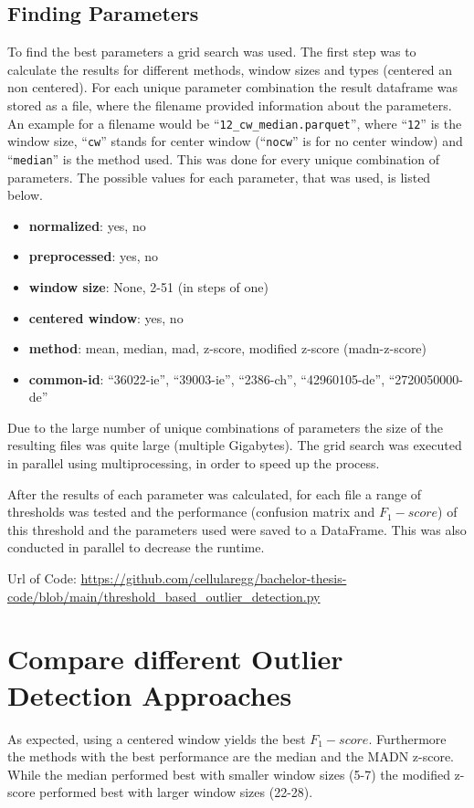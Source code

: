 \subsection{Finding Parameters}
To find the best parameters a grid search was used. The first step was to calculate the results for different methods, window sizes and types (centered an non centered). For each unique parameter combination the result dataframe was stored as a file, where the filename provided information about the parameters. An example for a filename would be ``\verb|12_cw_median.parquet|'', where ``\verb|12|'' is the window size, ``\verb|cw|'' stands for center window (``\verb|nocw|'' is for no center window) and ``\verb|median|'' is the method used. This was done for every unique combination of parameters. The possible values for each parameter, that was used, is listed below.
\begin{itemize}
    \item \textbf{normalized}: yes, no
    \item \textbf{preprocessed}: yes, no 
    \item \textbf{window size}: None, 2-51 (in steps of one)
    \item \textbf{centered window}: yes, no
    \item \textbf{method}: mean, median, mad, z-score, modified z-score (madn-z-score)
    \item \textbf{common-id}: ``36022-ie'', ``39003-ie'', ``2386-ch'', ``42960105-de'', ``2720050000-de''
\end{itemize}
Due to the large number of unique combinations of parameters the size of the resulting files was quite large (multiple Gigabytes). The grid search was executed in parallel using multiprocessing, in order to speed up the process.
\par
After the results of each parameter was calculated, for each file a range of thresholds was tested and the performance (confusion matrix and $F_1-score$) of this threshold and the parameters used were saved to a DataFrame. This was also conducted in parallel to decrease the runtime.
\par
Url of Code: \url{https://github.com/cellularegg/bachelor-thesis-code/blob/main/threshold_based_outlier_detection.py} 
\section{Compare different Outlier Detection Approaches}
As expected, using a centered window yields the best $F_1-score$. Furthermore the methods with the best performance are the median and the \ac{MADN} z-score. While the median performed best with smaller window sizes (5-7) the modified z-score performed best with larger window sizes (22-28).
